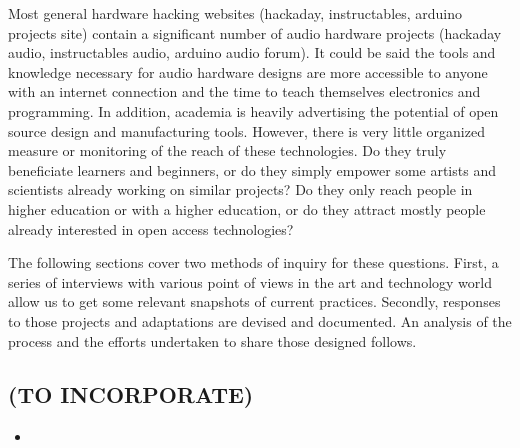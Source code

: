 Most general hardware hacking websites (hackaday, instructables, arduino projects site) contain a significant number of audio hardware projects (hackaday audio, instructables audio, arduino audio forum). It could be said the tools and knowledge necessary for audio hardware designs are more accessible to anyone with an internet connection and the time to teach themselves electronics and programming. In addition, academia is heavily advertising the potential of open source design and manufacturing tools. However, there is very little organized measure or monitoring of the reach of these technologies. Do they truly beneficiate learners and beginners, or do they simply empower some artists and scientists already working on similar projects? Do they only reach people in higher education or with a higher education, or do they attract mostly people already interested in open access technologies? 

The following sections cover two methods of inquiry for these questions. First, a series of interviews with various point of views in the art and technology world allow us to get some relevant snapshots of current practices. Secondly, responses to those projects and adaptations are devised and documented. An analysis of the process and the efforts undertaken to share those designed follows. 

\begin{unsortedStuff}	
\section*{(TO INCORPORATE)}
	\begin{itemize}
		\item 
	\end{itemize}
\end{unsortedStuff}
		
\begin{optBlankSpace}
	\newpage
	\mbox{}
\end{optBlankSpace}

